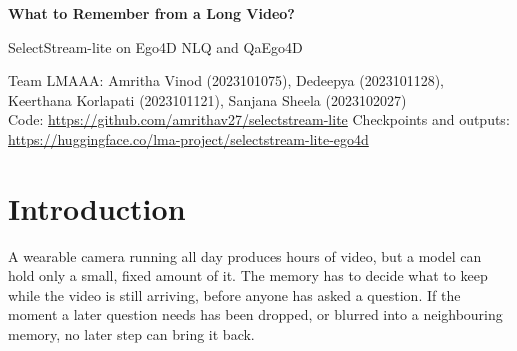 \documentclass[11pt,a4paper]{article}
\begin{document}
\begin{center}
{\LARGE\bfseries What to Remember from a Long Video?\par}
\vspace{0.3em}
{\large SelectStream-lite on Ego4D NLQ and QaEgo4D\par}
\vspace{0.5em}
Team LMAAA: Amritha Vinod (2023101075), Dedeepya (2023101128), Keerthana Korlapati (2023101121), Sanjana Sheela (2023102027)\\[0.2em]
{\small Code: \url{https://github.com/amrithav27/selectstream-lite} \quad
Checkpoints and outputs: \url{https://huggingface.co/lma-project/selectstream-lite-ego4d}}
\end{center}

\begin{abstract}
A streaming video memory of fixed size has to decide what to keep before it knows what will be asked. We rebuilt
SelectStream~\cite{selectstream}, which keeps a small graph of memory nodes and answers with a frozen Qwen2.5-VL-7B, and
ran it strictly in time order on every annotated clip of Ego4D NLQ and QaEgo4D. We asked two questions. Can an importance
score learned from past questions decide what to keep better than SelectStream's surprise signal (Q1)? Does splitting a
question about several moments into sub-questions help retrieval when the evidence budget stays the same (Q2)? Both answers
are no. The learned score keeps and retrieves the answer moment less often than surprise, on three training seeds and two
question sets. Splitting a question only helps when each part is given extra evidence, so the gain comes from the larger
budget, not from the split. Along the way we found that the frozen model's answers do not change with which moment it is
shown, so memories have to be compared by what they retrieve, not by the answers they lead to.
\end{abstract}

\section{Introduction}\label{sec:intro}

A wearable camera running all day produces hours of video, but a model can hold only a small, fixed amount
of it. The memory has to decide what to keep while the video is still arriving, before anyone has asked a
question. If the moment a later question needs has been dropped, or blurred into a neighbouring memory,
no later step can bring it back.
\end{document}
